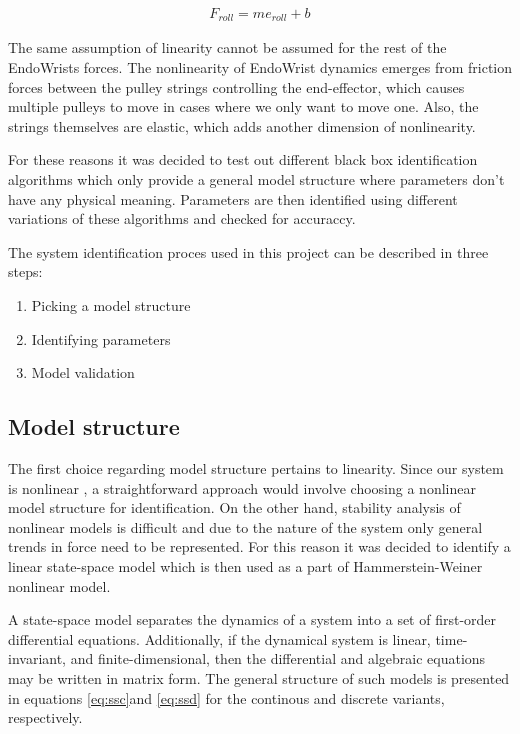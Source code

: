 \begin{align}
F_{roll} = m e_{roll} + b
\end{align}

The same assumption of linearity cannot be assumed for the rest of the EndoWrists forces.
The nonlinearity of EndoWrist dynamics emerges from friction forces between the pulley strings controlling the end-effector, which causes multiple pulleys to move in cases where we only want to move one. 
Also, the strings themselves are elastic, which adds another dimension of nonlinearity.

For these reasons it was decided to test out different black box identification algorithms which only provide a general model structure where parameters don't have any physical meaning. Parameters are then identified using different variations of these algorithms and checked for accuraccy.

The system identification proces used in this project can be described in three steps:
\begin{enumerate}
\item Picking a model structure
\item Identifying parameters
\item Model validation
\end{enumerate}

\subsection{Model structure}
The first choice regarding model structure pertains to linearity.
Since our system is nonlinear , a straightforward approach would involve choosing a nonlinear model structure for identification.
On the other hand, stability analysis of nonlinear models is difficult and due to the nature of the system only general trends in force need to be represented.
For this reason it was decided to identify a linear state-space model which is then used as a part of Hammerstein-Weiner nonlinear model.

A state-space model separates the dynamics of a system into a set of first-order differential equations.
Additionally, if the dynamical system is linear, time-invariant, and finite-dimensional, then the differential and algebraic equations may be written in matrix form. The general structure of such models is presented in equations \ref{eq:ssc}and \ref{eq:ssd} for the continous and discrete variants, respectively.

